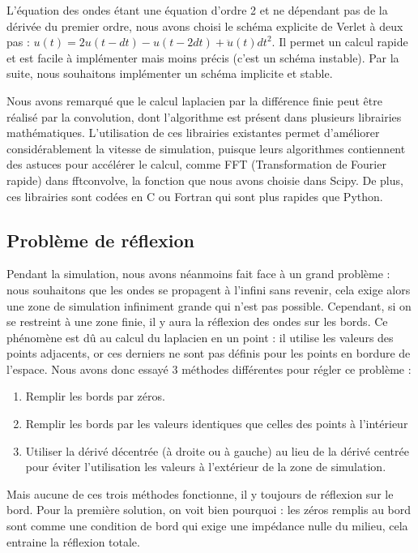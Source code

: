 \documentclass[11pt, a4paper]{article}
\begin{document}
L'équation des ondes étant une équation d'ordre 2 et ne dépendant pas de la dérivée du premier ordre, nous avons choisi le schéma explicite de Verlet à deux pas : $u(t)=2u(t-dt)-u(t-2dt)+\ddot{u}(t){dt}^2$. Il permet un calcul rapide et est facile à implémenter mais moins précis (c'est un schéma instable). Par la suite, nous souhaitons implémenter un schéma implicite et stable.

Nous avons remarqué que le calcul laplacien par la différence finie peut être réalisé par la convolution, dont l'algorithme est présent dans plusieurs librairies mathématiques. L'utilisation de ces librairies existantes permet d'améliorer considérablement la vitesse de simulation, puisque leurs algorithmes contiennent des astuces  pour accélérer le calcul, comme FFT (Transformation de Fourier rapide) dans fftconvolve, la fonction que nous avons choisie dans Scipy. De plus, ces librairies sont codées en C ou Fortran qui sont plus rapides que Python.

\subsection{Problème de réflexion}
Pendant la simulation, nous avons néanmoins fait face à un grand problème : nous souhaitons que les ondes se propagent à l'infini sans revenir, cela exige alors une zone de simulation infiniment grande qui n'est pas possible. Cependant, si on se restreint à une zone finie, il y aura la réflexion des ondes sur les bords. Ce phénomène est dû au calcul du laplacien en un point : il utilise les valeurs des points adjacents, or ces derniers ne sont pas définis pour les points en bordure de l'espace. Nous avons donc essayé 3 méthodes différentes pour régler ce problème :

\begin{enumerate}
    \item Remplir les bords par zéros.
    \item Remplir les bords par les valeurs identiques que celles des points à l'intérieur
    \item Utiliser la dérivé décentrée (à droite ou à gauche) au lieu de la dérivé centrée pour éviter l'utilisation les valeurs à l'extérieur de la zone de simulation.
\end{enumerate}
Mais aucune de ces trois méthodes fonctionne, il y toujours de réflexion sur le bord. Pour la première solution, on voit bien pourquoi : les zéros remplis au bord sont comme une condition de bord qui exige une impédance nulle du milieu, cela entraine la réflexion totale.
\end{document}
